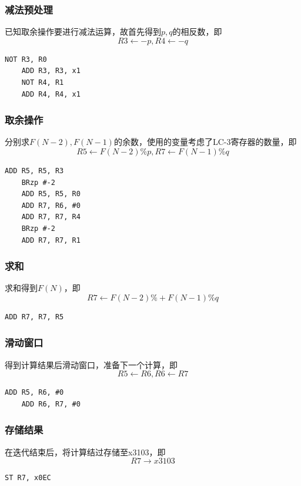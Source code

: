 \documentclass[12pt, a4paper, oneside]{ctexart}
\begin{document}
\subsubsection*{减法预处理}
已知取余操作要进行减法运算，故首先得到$p,q$的相反数，即$$R3 \leftarrow -p, R4 \leftarrow -q$$
\begin{lstlisting}[name = code, firstnumber = last]
    NOT R3, R0
    ADD R3, R3, x1
    NOT R4, R1
    ADD R4, R4, x1
\end{lstlisting}
\subsubsection*{取余操作}
分别求$F(N-2),F(N-1)$的余数，使用的变量考虑了LC-3寄存器的数量，即
$$R5 \leftarrow F(N-2) \% p, R7 \leftarrow F(N-1) \% q$$
\begin{lstlisting}[name = code, firstnumber = last]
    ADD R5, R5, R3 
    BRzp #-2
    ADD R5, R5, R0
    ADD R7, R6, #0
    ADD R7, R7, R4
    BRzp #-2
    ADD R7, R7, R1
\end{lstlisting}
\subsubsection*{求和}
求和得到$F(N)$，即
$$R7 \leftarrow F(N-2) \% + F(N-1) \% q$$
\begin{lstlisting}[name = code, firstnumber = last]
    ADD R7, R7, R5
\end{lstlisting}
\subsubsection*{滑动窗口}
得到计算结果后滑动窗口，准备下一个计算，即
$$R5 \leftarrow R6, R6 \leftarrow R7$$
\begin{lstlisting}[name = code, firstnumber = last]
    ADD R5, R6, #0
    ADD R6, R7, #0
\end{lstlisting}
\subsubsection*{存储结果}
在迭代结束后，将计算结过存储至x3103，即
$$R7 \rightarrow x3103$$
\begin{lstlisting}[name = code, firstnumber = last]
    ST R7, x0EC
\end{lstlisting}
\end{document}
